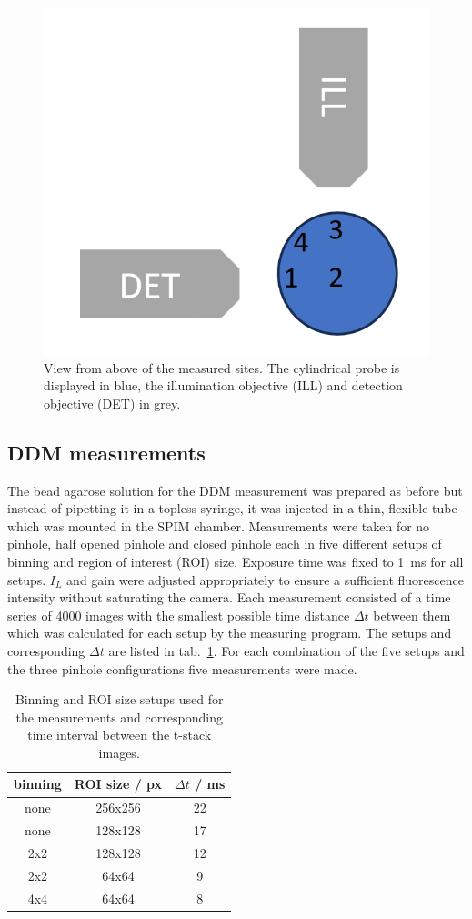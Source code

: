 \begin{figure}[ht]
    \centering
    \includegraphics[width = .5\textwidth]{Bilder/Setup/sites.png}
    \caption{View from above of the measured sites. The cylindrical probe is displayed in blue, the illumination objective (ILL) and detection objective (DET) in grey.}
    \label{fig:sites}
\end{figure}

\subsection*{DDM measurements}
The bead agarose solution for the DDM measurement was prepared as before but instead of pipetting it in a topless syringe, it was injected in a thin, flexible tube which was mounted in the SPIM chamber. Measurements were taken for no pinhole, half opened pinhole and closed pinhole each in five different setups of binning and region of interest (ROI) size. Exposure time was fixed to \SI{1}{\milli\second} for all setups. $I_L$ and gain were adjusted appropriately to ensure a sufficient fluorescence intensity without saturating the camera. Each measurement consisted of a time series of \num{4000} images with the smallest possible time distance $\Delta t$ between them which was calculated for each setup by the measuring program. The setups and corresponding $\Delta t$ are listed in tab.~\ref{tab:setups}. For each combination of the five setups and the three pinhole configurations five measurements were made. 

\begin{table}
    \centering
    \begin{tabular}{c c c}
        \toprule
        binning & ROI size / px & $\Delta t$ / \si{\milli\second} \\
        \midrule
        none & 256x256 & 22 \\
        none & 128x128 & 17 \\
        2x2 & 128x128 & 12 \\
        2x2 & 64x64 & 9 \\
        4x4 & 64x64 & 8 \\
        \bottomrule
    \end{tabular}
    \caption{Binning and ROI size setups used for the measurements and corresponding time interval between the t-stack images.}
    \label{tab:setups}
\end{table}
